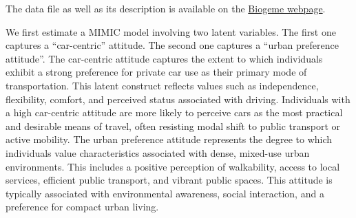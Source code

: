 \documentclass[12pt,a4paper]{article}
\begin{document}
The data file as well as its description is available on the \href{http://biogeme.epfl.ch/#data}{Biogeme webpage}.

We first  estimate a MIMIC model involving two latent variables. The
first one captures a ``car-centric'' attitude. The second one captures
a ``urban preference attitude''. The car-centric attitude captures the
extent to which individuals exhibit a strong preference for private
car use as their primary mode of transportation. This latent construct
reflects values such as independence, flexibility, comfort, and
perceived status associated with driving. Individuals with a high
car-centric attitude are more likely to perceive cars as the most
practical and desirable means of travel, often resisting modal shift
to public transport or active mobility. The urban preference attitude
represents the degree to which individuals value characteristics
associated with dense, mixed-use urban environments. This includes a
positive perception of walkability, access to local services,
efficient public transport, and vibrant public spaces. This attitude
is typically associated with environmental awareness, social
interaction, and a preference for compact urban living.
\end{document}
